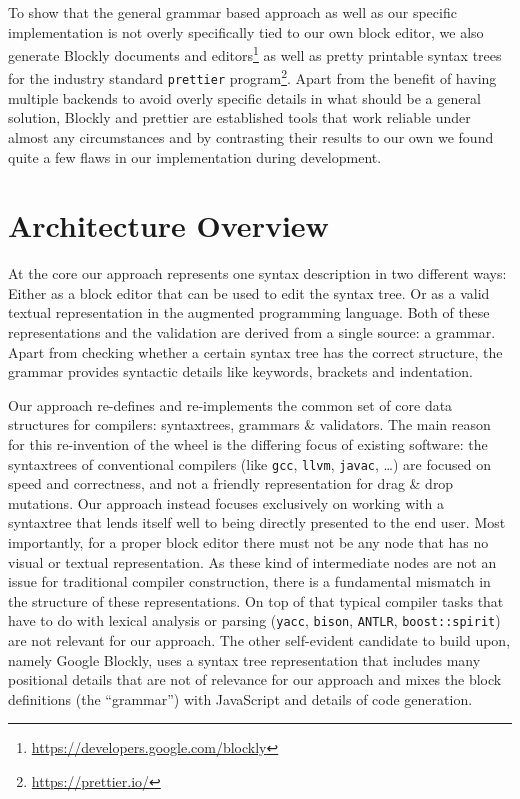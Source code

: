 \documentclass[sigconf,natbib=false,review=true,anonymous]{acmart}
\newcommand\todo[1]{{\bfseries ToDo: #1}}
\begin{document}
To show that the general grammar based approach as well as our specific implementation is not overly specifically tied to our own block editor, we also generate Blockly documents and editors\footnote{\url{https://developers.google.com/blockly}} as well as pretty printable syntax trees for the industry standard \texttt{prettier} program\footnote{\url{https://prettier.io/}}. Apart from the benefit of having multiple backends to avoid overly specific details in what should be a general solution, Blockly and prettier are established tools that work reliable under almost any circumstances and by contrasting their results to our own we found quite a few flaws in our implementation during development.

\section{Architecture Overview}

At the core our approach represents one syntax description in two different ways: Either as a block editor that can be used to edit the syntax tree. Or as a valid textual representation in the augmented programming language. Both of these representations and the validation are derived from a single source: a grammar. Apart from checking whether a certain syntax tree has the correct structure, the grammar provides syntactic details like keywords, brackets and indentation.

Our approach re-defines and re-implements the common set of core data structures for compilers: syntax\-trees, grammars \& validators. The main reason for this re-invention of the wheel is the differing focus of existing software: the syntaxtrees of conventional compilers (like \texttt{gcc}, \texttt{llvm}, \texttt{javac}, …) are focused on speed and correctness, and not a friendly representation for drag \& drop mutations. Our approach instead focuses exclusively on working with a syntaxtree that lends itself well to being directly presented to the end user. Most importantly, for a proper block editor there must not be any node that has no visual or textual representation. As these kind of intermediate nodes are not an issue for traditional compiler construction, there is a fundamental mismatch in the structure of these representations. On top of that typical compiler tasks that have to do with lexical analysis or parsing (\texttt{yacc}, \texttt{bison}, \texttt{ANTLR}, \texttt{boost::spirit}) are not relevant for our approach. The other self-evident candidate to build upon, namely Google Blockly, uses a syntax tree representation that includes many positional details that are not of relevance for our approach and mixes the block definitions (the \enquote{grammar}) with JavaScript and details of code generation.
\end{document}
